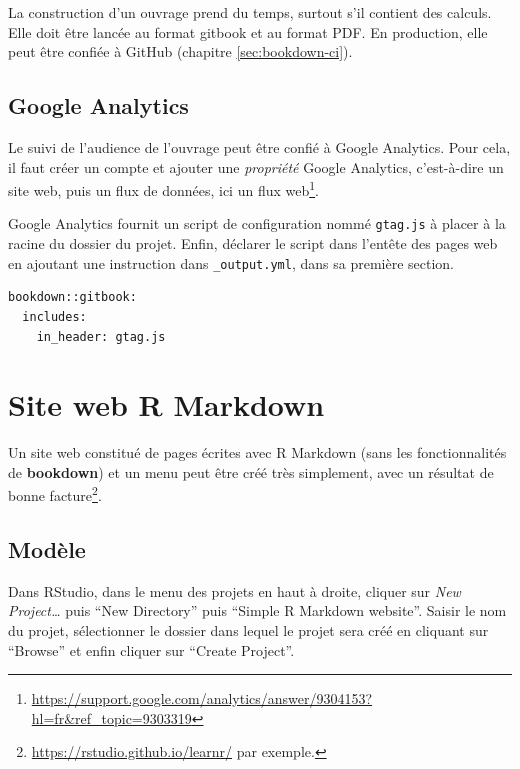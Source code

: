 \documentclass[
  11pt,
  french,
  a4paper,
  extrafontsizes,onecolumn,openright
  ]{memoir}
\begin{document}
La construction d'un ouvrage prend du temps, surtout s'il contient des calculs.
Elle doit être lancée au format gitbook et au format PDF.
En production, elle peut être confiée à GitHub (chapitre \ref{sec:bookdown-ci}).

\hypertarget{google-analytics}{%
\subsection{Google Analytics}\label{google-analytics}}

Le suivi de l'audience de l'ouvrage peut être confié à Google Analytics.
Pour cela, il faut créer un compte et ajouter une \emph{propriété} Google Analytics, c'est-à-dire un site web, puis un flux de données, ici un flux web\footnote{\url{https://support.google.com/analytics/answer/9304153?hl=fr\&ref_topic=9303319}}.

Google Analytics fournit un script de configuration nommé \texttt{gtag.js} à placer à la racine du dossier du projet.
Enfin, déclarer le script dans l'entête des pages web en ajoutant une instruction dans \texttt{\_output.yml}, dans sa première section.

\begin{verbatim}
bookdown::gitbook:
  includes:
    in_header: gtag.js
\end{verbatim}

\hypertarget{site-web-r-markdown}{%
\section{Site web R Markdown}\label{site-web-r-markdown}}

Un site web constitué de pages écrites avec R Markdown (sans les fonctionnalités de \textbf{bookdown}) et un menu peut être créé très simplement, avec un résultat de bonne facture\footnote{\url{https://rstudio.github.io/learnr/} par exemple.}.

\hypertarget{moduxe8le}{%
\subsection{Modèle}\label{moduxe8le}}

Dans RStudio, dans le menu des projets en haut à droite, cliquer sur \emph{New Project\ldots{}} puis ``New Directory'' puis ``Simple R Markdown website''.
Saisir le nom du projet, sélectionner le dossier dans lequel le projet sera créé en cliquant sur ``Browse'' et enfin cliquer sur ``Create Project''.
\end{document}
